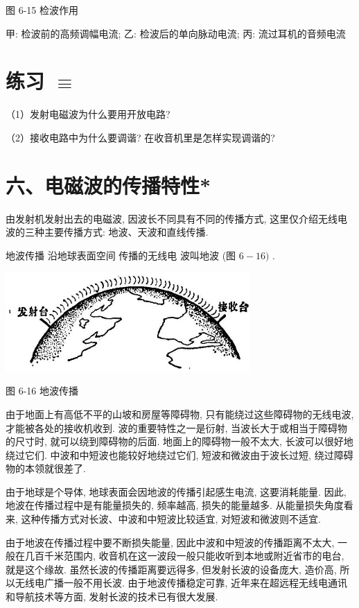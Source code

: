 \documentclass[10pt]{article}
\begin{document}
图 6-15 检波作用

甲: 检波前的高频调幅电流; 乙: 检波后的单向脉动电流; 丙: 流过耳机的音频电流

\section*{练习 \(\equiv\)}

（1）发射电磁波为什么要用开放电路?

（2）接收电路中为什么要调谐? 在收音机里是怎样实现调谐的?

\section*{六、电磁波的传播特性*}

由发射机发射出去的电磁波, 因波长不同具有不同的传播方式, 这里仅介绍无线电波的三种主要传播方式: 地波、天波和直线传播.

地波传播 沿地球表面空间 传播的无线电 波叫地波 (图 \(6 - {16})\) .

\begin{center}
\includegraphics[max width=0.7\textwidth]{images/01913056-1f15-74d8-9184-9aab52c9d66b_209_620613.jpg}
\end{center}

图 6-16 地波传播

由于地面上有高低不平的山坡和房屋等障碍物, 只有能绕过这些障碍物的无线电波, 才能被各处的接收机收到. 波的重要特性之一是衍射, 当波长大于或相当于障碍物的尺寸时, 就可以绕到障碍物的后面. 地面上的障碍物一般不太大, 长波可以很好地绕过它们. 中波和中短波也能较好地绕过它们, 短波和微波由于波长过短, 绕过障碍物的本领就很差了.

由于地球是个导体, 地球表面会因地波的传播引起感生电流, 这要消耗能量. 因此, 地波在传播过程中是有能量损失的, 频率越高, 损失的能量越多. 从能量损失角度看来, 这种传播方式对长波、中波和中短波比较适宜, 对短波和微波则不适宜.

由于地波在传播过程中要不断损失能量, 因此中波和中短波的传播距离不太大, 一般在几百千米范围内, 收音机在这一波段一般只能收听到本地或附近省市的电台, 就是这个缘故. 虽然长波的传播距离要远得多, 但发射长波的设备庞大, 造价高, 所以无线电广播一般不用长波. 由于地波传播稳定可靠, 近年来在超远程无线电通讯和导航技术等方面, 发射长波的技术已有很大发展.
\end{document}
